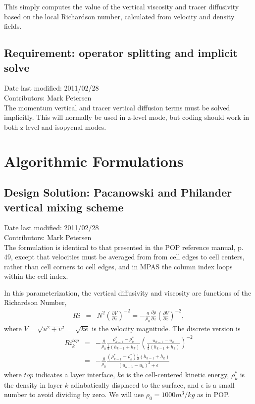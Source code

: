 \documentclass[11pt]{report}
\begin{document}
This simply computes the value of the vertical viscosity and tracer diffusivity based on the local Richardson number, calculated from velocity and density fields.


\section{Requirement: operator splitting and implicit solve}
Date last modified: 2011/02/28 \\
Contributors: Mark Petersen \\

The momentum vertical and tracer vertical diffusion terms must be solved implicitly.  This will normally be used in z-level mode, but coding should work in both z-level and isopycnal modes.


\chapter{Algorithmic Formulations}

\section{Design Solution: Pacanowski and Philander vertical mixing scheme}
Date last modified: 2011/02/28 \\
Contributors: Mark Petersen \\

The formulation is identical to that presented in the POP reference manual, p. 49, except that velocities must be averaged from from cell edges to cell centers, rather than cell corners to cell edges, and in MPAS the column index loops within the cell index.

In this parameterization, the vertical diffusivity and viscosity are functions of the Richardson Number,
\begin{eqnarray}   
\label{Ri1}
Ri &=& N^2
\left(\frac{\partial V}{\partial z} \right)^{-2}
 = -\frac{g}{\rho_0}\frac{\partial \rho}{\partial z}
\left(\frac{\partial V}{\partial z} \right)^{-2},
\end{eqnarray}
where $V=\sqrt{u^2+v^2}=\sqrt{ke}$ is the velocity magnitude.  The discrete version is
\begin{eqnarray}   
Ri^{top}_k &=& -\frac{g}{\rho_0}\frac{\rho^*_{k-1}-\rho^*_k}{\frac{1}{2}(h_{k-1}+h_k)}
\left(\frac{u_{k-1}-u_k}{\frac{1}{2}(h_{k-1}+h_k)}\right)^{-2}\\
 &=& -\frac{g}{\rho_0}\frac{(\rho^*_{k-1}-\rho^*_k)\frac{1}{2}(h_{k-1}+h_k)}
{(u_{k-1}-u_k)^2+\epsilon}
\end{eqnarray}
where $top$ indicates a layer interface, $ke$ is the cell-centered kinetic energy, $\rho^*_k$ is the density in layer $k$ adiabatically displaced to the surface, and $\epsilon$ is a small number to avoid dividing by zero.  We will use $\rho_0=1000m^3/kg$ as in POP.  
\end{document}
